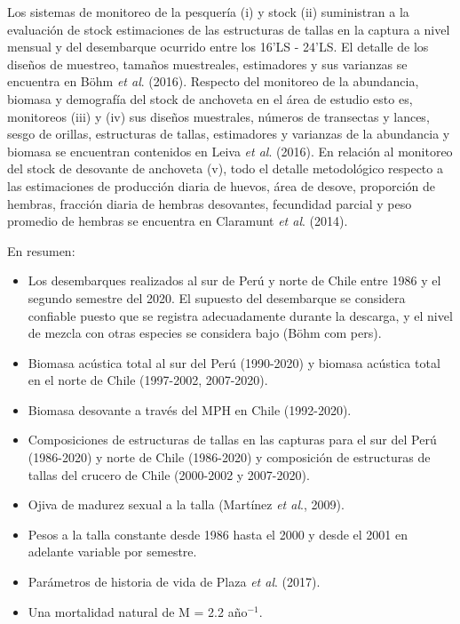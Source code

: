 \documentclass[letter,11pt]{article}
\begin{document}
Los sistemas de monitoreo de la pesquer\'ia (i) y stock (ii) suministran a
la evaluaci\'on de stock estimaciones de las estructuras de tallas en la
captura a nivel mensual y del desembarque ocurrido entre los
16'LS - 24'LS. El detalle de los dise\~{n}os de
muestreo, tama\~{n}os muestreales, estimadores y sus varianzas se encuentra
en B\"ohm \textit{et al}. (2016). Respecto del monitoreo de la abundancia,
biomasa y demograf\'ia del stock de anchoveta en el \'area de estudio esto
es, monitoreos (iii) y (iv) sus dise\~{n}os muestrales, n\'umeros de
transectas y lances, sesgo de orillas, estructuras de tallas,
estimadores y varianzas de la abundancia y biomasa se encuentran
contenidos en Leiva \textit{et al}. (2016). En relaci\'on al monitoreo del
stock de desovante de anchoveta (v), todo el detalle metodol\'ogico
respecto a las estimaciones de producci\'on diaria de huevos, \'area de
desove, proporci\'on de hembras, fracci\'on diaria de hembras desovantes,
fecundidad parcial y peso promedio de hembras se encuentra en Claramunt
\textit{et al}. (2014).

En resumen:

\begin{itemize}
\item
  Los desembarques realizados al sur de Per\'u y norte de Chile entre 1986
  y el segundo semestre del 2020. El supuesto del desembarque se
  considera confiable puesto que se registra adecuadamente durante la
  descarga, y el nivel de mezcla con otras especies se considera bajo
  (B\"ohm com pers).
\item
  Biomasa ac\'ustica total al sur del Per\'u (1990-2020) y biomasa ac\'ustica
  total en el norte de Chile (1997-2002, 2007-2020).
\item
  Biomasa desovante a trav\'es del MPH en Chile (1992-2020).
\item
  Composiciones de estructuras de tallas en las capturas para el sur del
  Per\'u (1986-2020) y norte de Chile (1986-2020) y composici\'on de
  estructuras de tallas del crucero de Chile (2000-2002 y 2007-2020).
\item
  Ojiva de madurez sexual a la talla (Mart\'inez \textit{et al}., 2009).
\item
  Pesos a la talla constante desde 1986 hasta el 2000 y desde el 2001 en
  adelante variable por semestre.
\item
  Par\'ametros de historia de vida de Plaza \textit{et al}. (2017).
\item
  Una mortalidad natural de M = 2.2 a\~{n}o$^{-1}$.
\end{itemize}
\end{document}
